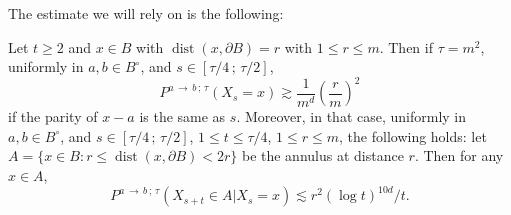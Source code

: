 \documentclass[AHL, Unicode, longabstracts, published]{cedram}
\DeclareMathOperator{\dist}{dist}
\newcommand{\Pmh}{P}
\begin{document}
The estimate we will rely on is the following:

\begin{lemm}\label{L:HKexc}
Let $t \ge 2$ and $x \in B$ with $\dist (x, \partial B) =r$ with $1 \le r \le m$. Then if $\tau = m^2$, uniformly in $a, b \in B^\circ$, and $s \in [\tau/4\,;\,\tau/2]$,
\begin{equation}\label{HKlb}
\Pmh^{a\,\to\,b\,;\,\tau} (X_s = x) \gtrsim \frac1{m^d} \left(\frac{r}{m}\right)^2
\end{equation}
if the parity of $x - a$ is the same as $s$. Moreover, in that case, uniformly in $a, b \in B^\circ$, and $s \in [\tau/4\,;\,\tau/2]$, $1 \le t \le \tau/4$, $ 1\le r \le m$, the following holds: let $A = \{x \in B : r \le \dist(x, \partial B) < 2r \}$ be the annulus at distance $r$. Then for any $x \in A$,
\begin{equation}\label{HKub}
\Pmh^{a\,\to\,b\,;\,\tau} (X_{s+ t} \in A | X_s = x) \lesssim r^2 (\log t)^{10d} / t.
\end{equation}
\end{lemm}
\end{document}
